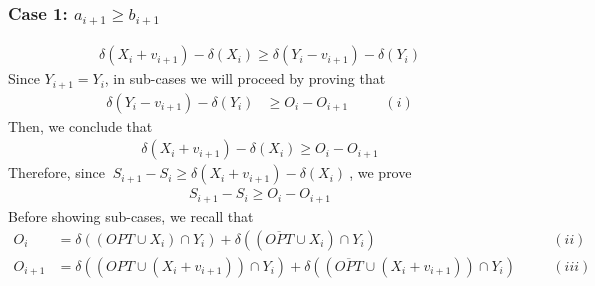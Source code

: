 \documentclass[a4paper,11pt]{article}
\begin{document}
\subsubsection{Case 1: $ a_{i+1} \geq b_{i+1}$}
\begin{align*}
\delta(X_{i} + v_{i+1}) - \delta(X_{i})  \geq \delta(Y_{i} - v_{i+1})  - \delta(Y_{i})
\end{align*}
Since $Y_{i+1} = Y_i$, in sub-cases we will proceed by proving that
\begin{align*}
\delta(Y_{i} - v_{i+1})  - \delta(Y_{i})  &\geq  O_i - O_{i+1} & &\quad(i)
\end{align*}
Then, we conclude that 
\begin{align*}
\delta(X_{i} + v_{i+1}) - \delta(X_{i})  \geq O_i - O_{i+1}
\end{align*}
Therefore, since $\ S_{i+1} - S_i \geq \delta(X_{i} + v_{i+1}) - \delta(X_{i}) \ $, we prove
\begin{align}
S_{i+1} - S_i  \geq O_i - O_{i+1} \label{3.5}
\end{align}
Before showing sub-cases, we recall that
\begin{align*}
O_i &= \delta((OPT \cup X_i) \cap Y_i) + \delta((\overline{OPT} \cup X_i) \cap Y_i) & &\quad(ii)\\
O_{i+1} &= \delta((OPT \cup (X_{i} + v_{i+1})) \cap Y_{i}) + \delta((\overline{OPT} \cup (X_{i} + v_{i+1})) \cap Y_{i}) & &\quad(iii)\\
\end{align*}
\end{document}
